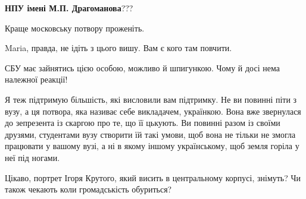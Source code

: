 \textbf{НПУ імені М.П. Драгоманова}???

 
Краще московську потвору проженіть.

 
Maria, правда, не ідіть з цього вишу. Вам є кого там повчити.

 
СБУ має зайнятись цією особою, можливо й шпигункою. Чому й досі нема належної реакції!

 

Я теж підтримую більшість, які висловили вам підтримку. Не ви повинні піти з
вузу, а ця потвора, яка називає себе викладачем, українкою. Вона вже звернулася
до зепрезента із скаргою про те, що її цькують. Ви повинні разом із своїми
друзями, студентами вузу створити їй такі умови, щоб вона не тільки не змогла
працювати у вашому вузі, а ні в якому іншому українському, щоб земля горіла у
неї під ногами.

 
Цікаво, портрет Ігоря Крутого, який висить в центральному корпусі, знімуть? Чи також чекають коли громадськість обуриться? \Smiley[1.0][yellow]

 
